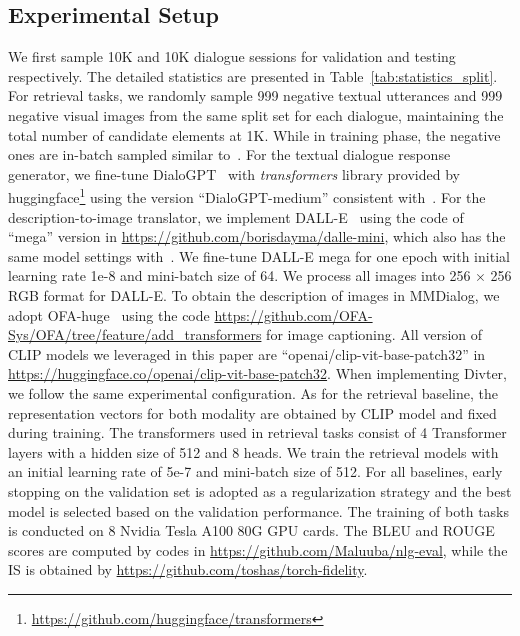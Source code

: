 \documentclass[11pt]{article}
\newcommand{\DataName}{MMDialog}
\begin{document}
\subsection{Experimental Setup}
We first sample 10K and 10K dialogue sessions for validation and testing respectively. The detailed statistics are presented in Table~\ref{tab:statistics_split}. For retrieval tasks, we randomly sample 999 negative textual utterances and 999 negative visual images from the same split set for each dialogue, maintaining the total number of candidate elements at 1K. While in training phase, the negative ones are in-batch sampled similar to~\citet{radford2021learning}. For the textual dialogue response generator, we fine-tune DialoGPT~\cite{zhang2020dialogpt} with \textit{transformers} library provided by huggingface\footnote{\url{https://github.com/huggingface/transformers}} using the version ``DialoGPT-medium'' consistent with~\citet{sun-etal-2022-multimodal}. For the description-to-image translator, we implement DALL-E~\cite{ramesh2021zero} using the code of ``mega'' version in \url{https://github.com/borisdayma/dalle-mini}, which also has the same model settings with~\citet{sun-etal-2022-multimodal}. We fine-tune DALL-E mega for one epoch with initial learning rate 1e-8 and mini-batch size of 64. We process all images into 256 $\times$ 256 RGB format for DALL-E. To obtain the description of images in \DataName, we adopt OFA-huge~\cite{wang2022ofa} using the code \url{https://github.com/OFA-Sys/OFA/tree/feature/add_transformers} for image captioning. All version of CLIP models we leveraged in this paper are ``openai/clip-vit-base-patch32'' in \url{https://huggingface.co/openai/clip-vit-base-patch32}. When implementing Divter, we follow the same experimental configuration. As for the retrieval baseline, the representation vectors for both modality are obtained by CLIP model and fixed during training. The transformers used in retrieval tasks consist of 4 Transformer layers with a hidden size of 512 and 8 heads. We train the retrieval models with an initial learning rate of 5e-7 and mini-batch size of 512. For all baselines, early stopping on the validation set is adopted as a regularization strategy and the best model is selected based on the validation performance. The training of both tasks is conducted on 8 Nvidia Tesla A100 80G GPU cards. The BLEU and ROUGE scores are computed by codes in \url{https://github.com/Maluuba/nlg-eval}, while the IS is obtained by \url{https://github.com/toshas/torch-fidelity}.
\end{document}
